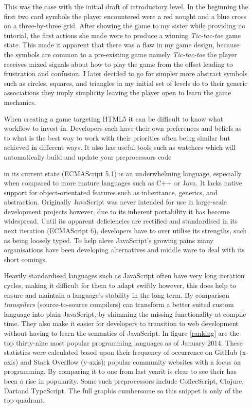 \documentclass[final]{cmpreport}
\begin{document}
This was the case with the initial draft of introductory level. In the beginning the first two card symbols the player encountered were a red nought and a blue cross on a three-by-three grid. After showing the game to my sister while providing no tutorial, the first actions she made were to produce a winning \emph{Tic-tac-toe} game state. This made it apparent that there was a flaw in my game design, because the symbols are common to a pre-existing game namely \emph{Tic-tac-toe} the player receives mixed signals about how to play the game from the offset leading to frustration and confusion. I later decided to go for simpler more abstract symbols such as circles, squares, and triangles in my initial set of levels do to their generic associations they imply simplicity leaving the player open to learn the game mechanics.

When creating a game targeting HTML5 it can be difficult to know what workflow to invest in. Developers each have their own preferences and beliefs as to what is the best way to work with their priorities often being similar but achieved in different ways. It also has useful tools such as watchers which will automatically build and update your preprocessors code

\label{sec:transpilers}

 in its current state (ECMAScript 5.1) is an underwhelming language, especially when compared to more mature languages such as C++ or Java. It lacks native support for object-orientated features such as inheritance, generics, and abstraction. Originally JavaScript was never intended for use in large-scale development projects however, due to its inherent portability it has become widespread. Until its apparent deficiencies are rectified and standardised in its next iteration (ECMAScript 6), developers have to over utilise its strengths, such as being loosely typed. To help aleve JavaScript's growing pains many organisations have been developing alternatives and middle ware to deal with its short comings.

Heavily standardised languages such as JavaScript often have very long iteration cycles, making it difficult for them to adapt swiftly however, this does help to ensure and maintain a language's stability in the long term. By comparison \textit{transpilers} (source-to-source compilers) can transform a better suited custom language into plain JavaScript, by shimming the missing functionality at compile time. They also make it easier for developers to transition to web development without having to learn the semantics of JavaScript. In figure \ref{ranking} are the top thirty-nine most popular programming languages as of January 2014. These statistics were calculated based upon their frequency of occurrence on GitHub (x-axis) and Stack Overflow (y-axis); popular community websites with a focus on programming. By comparing it to one from last year\footnotemark it is clear to see their has been a rise in popularity. Some such preprocessors include CoffeeScript\footnotemark, Clojure\footnotemark, Dart\footnotemark and TypeScript\footnotemark. The full graph\footnotemark is cumbersome so this snippet is only of the top quadrant.
\end{document}
